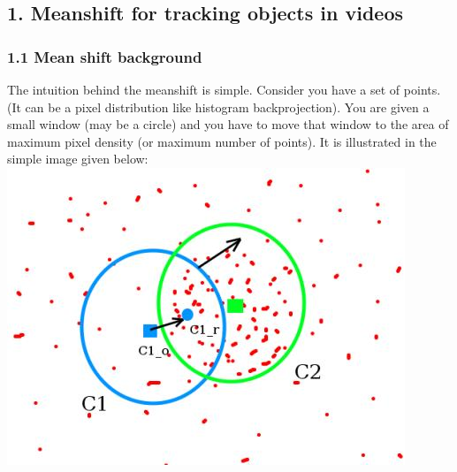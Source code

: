 \documentclass[11pt]{article}
\makeatletter
\def\maxwidth{\ifdim\Gin@nat@width>\linewidth\linewidth
    \else\Gin@nat@width\fi}
\let\Oldincludegraphics\includegraphics
\renewcommand{\includegraphics}[1]{\Oldincludegraphics[width=.8\maxwidth]{#1}}
\makeatother
\begin{document}
    \hypertarget{meanshift-for-tracking-objects-in-videos}{%
\subsection{1. Meanshift for tracking objects in
videos}\label{meanshift-for-tracking-objects-in-videos}}

\hypertarget{mean-shift-background}{%
\subsubsection{1.1 Mean shift background}\label{mean-shift-background}}

The intuition behind the meanshift is simple. Consider you have a set of
points. (It can be a pixel distribution like histogram backprojection).
You are given a small window (may be a circle) and you have to move that
window to the area of maximum pixel density (or maximum number of
points). It is illustrated in the simple image given below:
\includegraphics{meanshift_basics.jpg}
\end{document}
